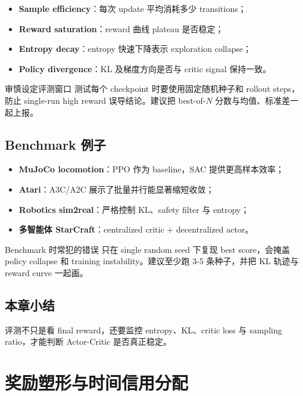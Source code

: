 \documentclass[a4paper]{article}
\begin{document}
\begin{itemize}
    \item \textbf{Sample efficiency}：每次 update 平均消耗多少 transitions；
    \item \textbf{Reward saturation}：reward 曲线 plateau 是否稳定；
    \item \textbf{Entropy decay}：entropy 快速下降表示 exploration collapse；
    \item \textbf{Policy divergence}：KL 及梯度方向是否与 critic signal 保持一致。
\end{itemize}

\begin{importantbox}{审慎设定评测窗口}
测试每个 checkpoint 时要使用固定随机种子和 rollout steps，防止 single-run high reward 误导结论。建议把 best-of-$N$ 分数与均值、标准差一起上报。
\end{importantbox}

\subsection{Benchmark 例子}

\begin{itemize}
    \item \textbf{MuJoCo locomotion}：PPO 作为 baseline，SAC 提供更高样本效率；
    \item \textbf{Atari}：A3C/A2C 展示了批量并行能显著缩短收敛；
    \item \textbf{Robotics sim2real}：严格控制 KL、safety filter 与 entropy；
    \item \textbf{多智能体 StarCraft}：centralized critic + decentralized actor。
\end{itemize}

\begin{knowledgebox}{Benchmark 时常犯的错误}
只在 single random seed 下复现 best score，会掩盖 policy collapse 和 training instability。建议至少跑 3-5 条种子，并把 KL 轨迹与 reward curve 一起画。
\end{knowledgebox}

\subsection{本章小结}

评测不只是看 final reward，还要监控 entropy、KL、critic loss 与 sampling ratio，才能判断 Actor-Critic 是否真正稳定。

\section{奖励塑形与时间信用分配}
\end{document}
